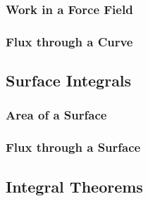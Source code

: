 \subsubsection{Work in a Force Field}

\subsubsection{Flux through a Curve}


\subsection{Surface Integrals}
\subsubsection{Area of a Surface}
\subsubsection{Flux through a Surface}

\subsection{Integral Theorems}

